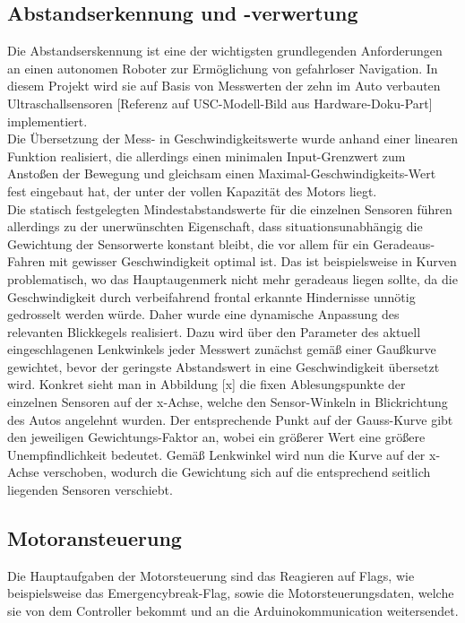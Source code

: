 \documentclass[12pt,a4paper]{report}
\begin{document}
\subsection{Abstandserkennung und -verwertung}
Die Abstandserskennung ist eine der wichtigsten grundlegenden Anforderungen an einen autonomen Roboter zur Ermöglichung von gefahrloser Navigation. In diesem Projekt wird sie auf Basis von Messwerten der zehn im Auto verbauten Ultraschallsensoren [Referenz auf USC-Modell-Bild aus Hardware-Doku-Part] implementiert.\\
Die Übersetzung der Mess- in Geschwindigkeitswerte wurde anhand einer linearen Funktion realisiert, die allerdings einen minimalen Input-Grenzwert zum Anstoßen der Bewegung und gleichsam einen Maximal-Geschwindigkeits-Wert fest eingebaut hat, der unter der vollen Kapazität des Motors liegt.\\
Die statisch festgelegten Mindestabstandswerte für die einzelnen Sensoren führen allerdings zu der unerwünschten Eigenschaft, dass situationsunabhängig die Gewichtung der Sensorwerte konstant bleibt, die vor allem für ein Geradeaus-Fahren mit gewisser Geschwindigkeit optimal ist. Das ist beispielsweise in Kurven problematisch, wo das Hauptaugenmerk nicht mehr geradeaus liegen sollte, da die Geschwindigkeit durch verbeifahrend frontal erkannte Hindernisse unnötig gedrosselt werden würde. Daher wurde eine dynamische Anpassung des relevanten Blickkegels realisiert. Dazu wird über den Parameter des aktuell eingeschlagenen Lenkwinkels jeder Messwert zunächst gemäß einer Gaußkurve gewichtet, bevor der geringste Abstandswert in eine Geschwindigkeit übersetzt wird. Konkret sieht man in Abbildung [x] die fixen Ablesungspunkte der einzelnen Sensoren auf der x-Achse, welche den Sensor-Winkeln in Blickrichtung des Autos angelehnt wurden. Der entsprechende Punkt auf der Gauss-Kurve gibt den jeweiligen Gewichtungs-Faktor an, wobei ein größerer Wert eine größere Unempfindlichkeit bedeutet. Gemäß Lenkwinkel wird nun die Kurve auf der x-Achse verschoben, wodurch die Gewichtung sich auf die entsprechend seitlich liegenden Sensoren verschiebt.


\subsection{Motoransteuerung}
Die Hauptaufgaben der Motorsteuerung sind das Reagieren auf Flags, wie beispielsweise das Emergencybreak-Flag, sowie die Motorsteuerungsdaten, welche sie von dem Controller bekommt und an die Arduinokommunication weitersendet.\\
\end{document}
